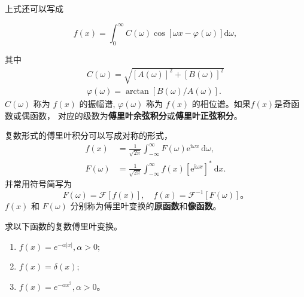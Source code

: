 上式还可以写成

\begin{equation}
    f(x)=\int_0^{\infty} C(\omega) \cos [\omega x-\varphi(\omega)] \mathrm{d} \omega,
\end{equation}

其中
$$
\begin{gathered}
C(\omega)=\sqrt{[A(\omega)]^2+[B(\omega)]^2} \\
\varphi(\omega)=\arctan [B(\omega) / A(\omega)] .
\end{gathered}
$$
$C(\omega)$ 称为 $f(x)$ 的振幅谱, $\varphi(\omega)$ 称为 $f(x)$ 的相位谱。如果$f(x)$是奇函数或偶函数，
对应的级数为\textbf{傅里叶余弦积分}或\textbf{傅里叶正弦积分}。

复数形式的傅里叶积分可以写成对称的形式，
\begin{equation}
    \begin{aligned}
    f(x) & =\frac{1}{\sqrt{2 \pi}} \int_{-\infty}^{\infty} F(\omega) \mathrm{e}^{\mathrm{i} \omega x} \mathrm{~d} \omega, \\
    F(\omega) & =\frac{1}{\sqrt{2 \pi}} \int_{-\infty}^{\infty} f(x)\left[\mathrm{e}^{\mathrm{i} \omega x}\right]^* \mathrm{~d} x .
    \end{aligned}
\end{equation}
并常用符号简写为
$$
F(\omega)=\mathcal{F}[f(x)], \quad f(x)=\mathcal{F}^{-1}[F(\omega)] \textrm{。}
$$
$f(x)$ 和 $F(\omega)$ 分别称为傅里叶变换的\textbf{原函数}和\textbf{像函数}。

\begin{examplebox}{
求以下函数的复数傅里叶变换。
\begin{enumerate}
    \item $f(x) = e^{-\alpha |x|}, \alpha > 0$;
    \item $f(x) = \delta (x)$;
    \item $f(x) = e^{-\alpha x^2}, \alpha > 0$。
\end{enumerate}
}
\end{examplebox}